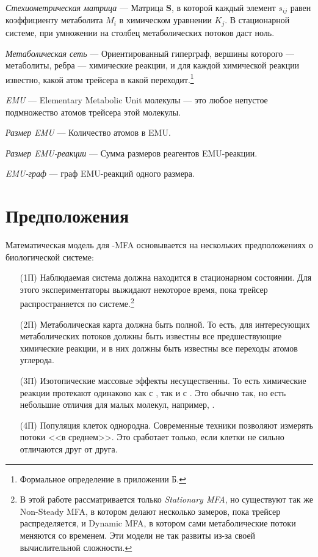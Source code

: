 \documentclass[14pt, a4paper]{extreport}
\begin{document}
\hangindent=1cm \noindent
\emph{Стехиометрическая матрица} --- Матрица $\mathbf{S}$, в которой каждый элемент $s_{ij}$ равен коэффициенту метаболита $M_i$ в химическом уравнении $K_j$. В стационарной системе, при умножении на столбец метаболических потоков даст ноль.

\hangindent=1cm \noindent
\emph{Метаболическая сеть} --- Ориентированный гиперграф, вершины которого --- метаболиты, ребра --- химические реакции, и для каждой химической реакции известно, какой атом трейсера в какой переходит.\footnote{Формальное определение в приложении Б.}

\hangindent=1cm \noindent
\emph{EMU} --- Elementary Metabolic Unit молекулы --- это любое непустое подмножество атомов трейсера этой молекулы.

\hangindent=1cm \noindent
\emph{Размер EMU} --- Количество атомов в EMU.

\hangindent=1cm \noindent
\emph{Размер EMU-реакции} --- Сумма размеров реагентов EMU-реакции.

\hangindent=1cm \noindent
\emph{EMU-граф} --- граф EMU-реакций одного размера.



\clearpage

\section{Предположения}
Математическая модель для -MFA основывается на нескольких предположениях о биологической системе\cite{Wiechert_1997_1}:
\begin{enumerate}
	\item[(1П)] Наблюдаемая система должна находится в стационарном состоянии. Для этого экспериментаторы выжидают некоторое время, пока трейсер распространяется по системе.\footnote{В этой работе рассматривается только \emph{Stationary MFA}, но существуют так же Non-Steady MFA\cite{NMFA}, в котором делают несколько замеров, пока трейсер распределяется, и Dynamic MFA\cite{DMFA}, в котором сами метаболические потоки меняются со временем. Эти модели не так развиты из-за своей вычислительной сложности.}
	
	\item[(2П)] Метаболическая карта должна быть полной. То есть, для интересующих метаболических потоков должны быть известны все предшествующие химические реакции, и в них должны быть известны все переходы атомов углерода.
	
	\item[(3П)] Изотопические массовые эффекты несущественны. То есть химические реакции протекают одинаково как с , так и с . Это обычно так, но есть небольшие отличия для малых молекул, например, .
	
	\item[(4П)] Популяция клеток однородна. Современные техники позволяют измерять потоки <<в среднем>>. Это сработает только, если клетки не сильно отличаются друг от друга.
\end{enumerate}
\end{document}
